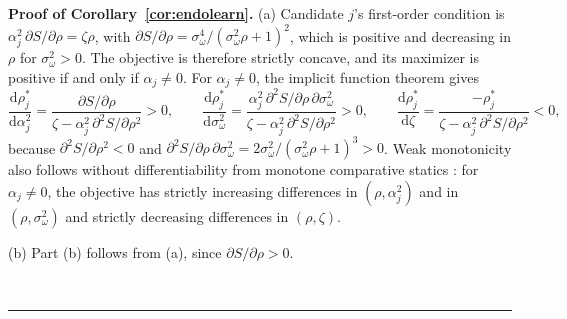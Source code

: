 \documentclass[12pt,letterpaper]{article}
\newenvironment{proof}[1][Proof]{\noindent\textbf{#1.} }{\ \rule{0.5em}{0.5em}}
\begin{document}
\begin{proof}[Proof of Corollary~\ref{cor:endolearn}]
(a) Candidate $j$'s first-order condition is $\alpha_j^2\,\partial S/\partial \rho=\zeta \rho$, with $\partial S/\partial \rho=\sigma_\omega^4/(\sigma_\omega^2\rho+1)^2$, which is positive and decreasing in $\rho$ for $\sigma_\omega^2>0$. The objective is therefore strictly concave, and its maximizer is positive if and only if $\alpha_j\ne0$. For $\alpha_j\ne0$, the implicit function theorem gives
\[
\frac{\mathrm{d}\rho_j^*}{\mathrm{d}\alpha_j^2}=\frac{\partial S/\partial \rho}{\zeta-\alpha_j^2\,\partial^2S/\partial \rho^2}>0,
\qquad
\frac{\mathrm{d}\rho_j^*}{\mathrm{d}\sigma_\omega^2}=\frac{\alpha_j^2\,\partial^2S/\partial \rho\,\partial \sigma_\omega^2}{\zeta-\alpha_j^2\,\partial^2S/\partial \rho^2}>0,
\qquad
\frac{\mathrm{d}\rho_j^*}{\mathrm{d}\zeta}=\frac{-\rho_j^*}{\zeta-\alpha_j^2\,\partial^2S/\partial \rho^2}<0,
\]
because $\partial^2S/\partial \rho^2<0$ and $\partial^2S/\partial \rho\,\partial \sigma_\omega^2=2\sigma_\omega^2/(\sigma_\omega^2\rho+1)^3>0$. Weak monotonicity also follows without differentiability from monotone comparative statics \citep{MilgromShannon1994,Topkis1998}: for $\alpha_j\ne0$, the objective has strictly increasing differences in $(\rho,\alpha_j^2)$ and in $(\rho,\sigma_\omega^2)$ and strictly decreasing differences in $(\rho,\zeta)$.

(b) Part (b) follows from (a), since $\partial S/\partial \rho >0$.


\end{proof}
\end{document}
